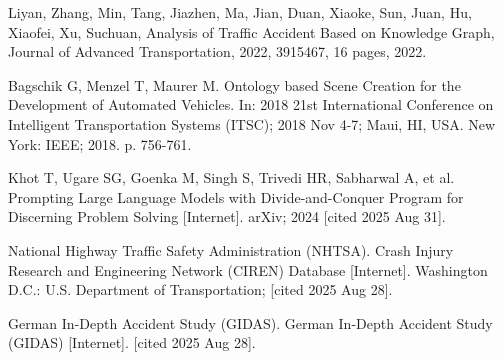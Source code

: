 \begin{thebibliography}{99}

Liyan, Zhang, Min, Tang, Jiazhen, Ma, Jian, Duan, Xiaoke, Sun, Juan, Hu, Xiaofei, Xu, Suchuan, Analysis of Traffic Accident Based on Knowledge Graph, Journal of Advanced Transportation, 2022, 3915467, 16 pages, 2022.

Bagschik G, Menzel T, Maurer M. Ontology based Scene Creation for the Development of Automated Vehicles. In: 2018 21st International Conference on Intelligent Transportation Systems (ITSC); 2018 Nov 4-7; Maui, HI, USA. New York: IEEE; 2018. p. 756-761.

Khot T, Ugare SG, Goenka M, Singh S, Trivedi HR, Sabharwal A, et al. Prompting Large Language Models with Divide-and-Conquer Program for Discerning Problem Solving [Internet]. arXiv; 2024 [cited 2025 Aug 31].

National Highway Traffic Safety Administration (NHTSA). Crash Injury Research and Engineering Network (CIREN) Database [Internet]. Washington D.C.: U.S. Department of Transportation; [cited 2025 Aug 28].

German In-Depth Accident Study (GIDAS). German In-Depth Accident Study (GIDAS) [Internet]. [cited 2025 Aug 28].

\end{thebibliography}